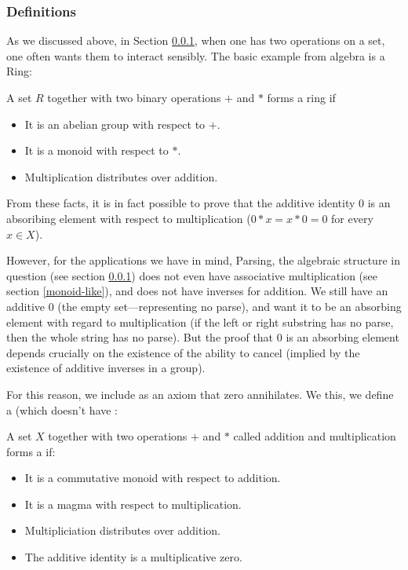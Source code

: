 \documentclass{article}
\begin{document}
\subsubsection{Definitions}
As we discussed above, in Section \ref{}, when one has two operations on a set, one often wants them to interact sensibly. The basic example from algebra is a Ring:
\begin{Definition}
A set $R$ together with two binary operations $+$ and $*$ forms a ring if
\begin{itemize}
\item It is an abelian group with respect to $+$.
\item It is a monoid with respect to $*$.
\item Multiplication distributes over addition.
\end{itemize}
\end{Definition}
From these facts, it is in fact possible to prove that the additive identity $0$ is an absoribing element with respect to multiplication ($0 * x = x * 0 = 0$ for every $x \in X$).

However, for the applications we have in mind, Parsing, the algebraic structure in question (see section \ref{}) does not even have associative multiplication (see section \ref{monoid-like}), and does not have inverses for addition. We still have an additive $0$ (the empty set---representing no parse), and want it to be an absorbing element with regard to multiplication (if the left or right substring has no parse, then the whole string has no parse). But the proof that $0$ is an absorbing element depends crucially on the existence of the ability to cancel (implied by the existence of additive inverses in a group).

For this reason, we include as an axiom that zero annihilates. We this, we define a \nanring (which doesn't have :
\begin{Definition}
A set $X$ together with two operations $+$ and $*$ called addition and multiplication forms a \emph{\nanring} if:
\begin{itemize}
\item It is a commutative monoid with respect to addition.
\item It is a magma with respect to multiplication.
\item Multipliciation distributes over addition.
\item The additive identity is a multiplicative zero.
\end{itemize}
\end{Definition}
\end{document}
